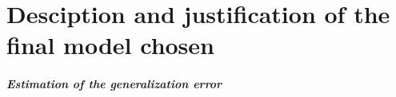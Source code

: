 
\section{Desciption and justification of the final model chosen}

\subparagraph{Estimation of the generalization error}
